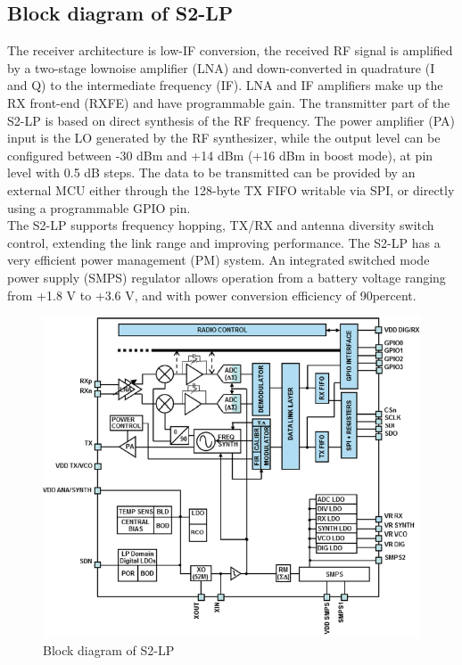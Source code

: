 \subsection{Block diagram of S2-LP}
The receiver architecture is low-IF conversion, the received RF signal is amplified by a two-stage lownoise amplifier (LNA) and down-converted in quadrature (I and Q) to the intermediate frequency (IF). LNA and IF amplifiers make up the RX front-end (RXFE) and have programmable gain. The transmitter part of the S2-LP is based on direct synthesis of the RF frequency. The power amplifier (PA) input is the LO generated by the RF synthesizer, while the output level can be configured between -30 dBm and +14 dBm (+16 dBm in boost mode), at pin level with 0.5 dB steps. The data to be transmitted can be provided by an external MCU either through the 128-byte TX FIFO writable via SPI, or directly using a programmable GPIO pin.\\
The S2-LP supports frequency hopping, TX/RX and antenna diversity switch control, extending the link range and improving performance. The S2-LP has a very efficient power management (PM) system. An integrated switched mode power supply (SMPS) regulator allows operation from a battery voltage ranging from +1.8 V to +3.6 V, and with power conversion efficiency of 90percent.
\begin{figure}[ht]
	\centering
	\includegraphics[scale=0.8]{images/spirit.png}
	\caption{Block diagram of S2-LP}
\end{figure}
